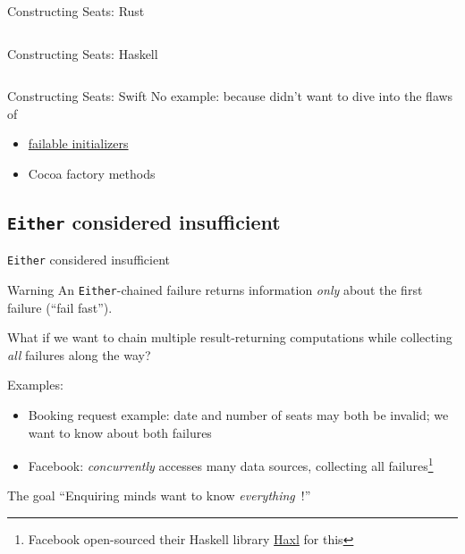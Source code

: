 \begin{frame}{Constructing Seats: Rust}
  \inputminted{rust}{seats.rs}
\end{frame}

\begin{frame}{Constructing Seats: Haskell}
  \inputminted{haskell}{Seats.hs}
\end{frame}

\begin{frame}{Constructing Seats: Swift}
  No example: because didn't want to dive into the flaws of
  \begin{itemize}
  \item \href{https://developer.apple.com/swift/blog/?id=17}{failable
    initializers}
  \item Cocoa factory methods
  \end{itemize}
\end{frame}

\subsection{\texttt{Either} considered insufficient}

\begin{frame}{\texttt{Either} considered insufficient}
  \begin{alertblock}{Warning}
    An \texttt{Either}-chained failure returns information \emph{only}
    about the first failure (``fail fast'').

    What if we want to chain multiple result-returning computations
    while collecting \emph{all} failures along the way?
  \end{alertblock}

  Examples:
  \begin{itemize}
  \item Booking request example: date and number of seats may both be invalid; we want to know about both failures
  \item Facebook: \emph{concurrently} accesses many data sources, collecting all failures\footnote{Facebook open-sourced their Haskell library \href{https://github.com/facebook/Haxl}{Haxl} for this}
  \end{itemize}

  \begin{alertblock}{The goal}
    ``Enquiring minds want to know \emph{everything}\ !''
  \end{alertblock}
\end{frame}


